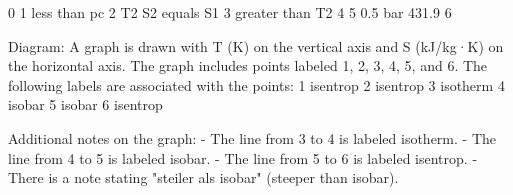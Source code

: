 0
1 less than pc
2 T2
S2 equals S1
3 greater than T2
4
5 0.5 bar 431.9
6

Diagram:
A graph is drawn with T (K) on the vertical axis and S (kJ/kg·K) on the horizontal axis. The graph includes points labeled 1, 2, 3, 4, 5, and 6. The following labels are associated with the points:
1 isentrop
2 isentrop
3 isotherm
4 isobar
5 isobar
6 isentrop

Additional notes on the graph:
- The line from 3 to 4 is labeled isotherm.
- The line from 4 to 5 is labeled isobar.
- The line from 5 to 6 is labeled isentrop.
- There is a note stating "steiler als isobar" (steeper than isobar).